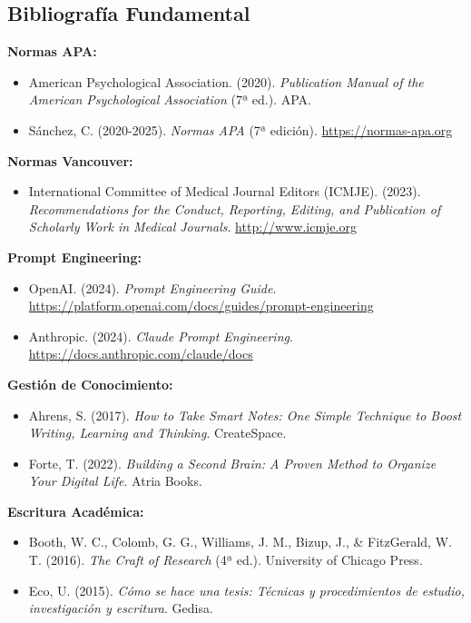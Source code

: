 \documentclass[12pt,a4paper]{yaac-luatex}
\begin{document}
	\subsection*{Bibliografía Fundamental}
	
	\textbf{Normas APA:}
	\begin{itemize}[leftmargin=*, itemsep=0.2cm]
		\item American Psychological Association. (2020). \textit{Publication Manual of the American Psychological Association} (7ª ed.). APA.
		\item Sánchez, C. (2020-2025). \textit{Normas APA} (7ª edición). \url{https://normas-apa.org}
	\end{itemize}
	
	\textbf{Normas Vancouver:}
	\begin{itemize}[leftmargin=*, itemsep=0.2cm]
		\item International Committee of Medical Journal Editors (ICMJE). (2023). \textit{Recommendations for the Conduct, Reporting, Editing, and Publication of Scholarly Work in Medical Journals}. \url{http://www.icmje.org}
	\end{itemize}
	
	\textbf{Prompt Engineering:}
	\begin{itemize}[leftmargin=*, itemsep=0.2cm]
		\item OpenAI. (2024). \textit{Prompt Engineering Guide}. \url{https://platform.openai.com/docs/guides/prompt-engineering}
		\item Anthropic. (2024). \textit{Claude Prompt Engineering}. \url{https://docs.anthropic.com/claude/docs}
	\end{itemize}
	
	\textbf{Gestión de Conocimiento:}
	\begin{itemize}[leftmargin=*, itemsep=0.2cm]
		\item Ahrens, S. (2017). \textit{How to Take Smart Notes: One Simple Technique to Boost Writing, Learning and Thinking}. CreateSpace.
		\item Forte, T. (2022). \textit{Building a Second Brain: A Proven Method to Organize Your Digital Life}. Atria Books.
	\end{itemize}


	\textbf{Escritura Académica:}
	\begin{itemize}[leftmargin=*, itemsep=0.2cm]
		\item Booth, W. C., Colomb, G. G., Williams, J. M., Bizup, J., \& FitzGerald, W. T. (2016). \textit{The Craft of Research} (4ª ed.). University of Chicago Press.
		\item Eco, U. (2015). \textit{Cómo se hace una tesis: Técnicas y procedimientos de estudio, investigación y escritura}. Gedisa.
	\end{itemize}
	
\end{document}
